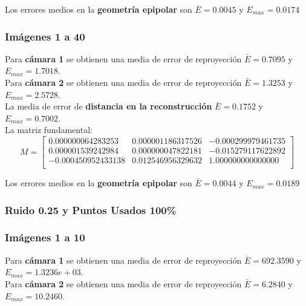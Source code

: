 \documentclass[a4paper, fontsize=11pt]{scrartcl} %
\numberwithin{equation}{section} %
\numberwithin{figure}{section} %
\numberwithin{table}{section} %
\begin{document}
	Los errores medios en la \textbf{geometría epipolar} son $\bar{E} =  0.0045$ y $E_{max} = 0.0174$
	
	\subsubsection*{Imágenes 1 a 40}
	
	Para \textbf{cámara 1} se obtienen una media de error de reproyección $\bar{E} = 0.7095$ y $E_{max} = 1.7018$.\\
	Para \textbf{cámara 2} se obtienen una media de error de reproyección $\bar{E} = 1.3253$ y $E_{max} = 2.5728$.\\
	
	La media de error de \textbf{distancia en la reconstrucción} $\bar{E} = 0.1752$ y $E_{max} = 0.7002$.\\
	La matriz fundamental:
	\[
	M=
	\begin{bmatrix}
	0.000000064283253&	0.000001186317526&	-0.000299979461735 \\
	0.000001539242984&	0.000000047822181&	-0.015279117622892 \\
	-0.000450952433138&	0.012546956329632&	1.000000000000000  \\
	
	\end{bmatrix}
	\]
	
	Los errores medios en la \textbf{geometría epipolar} son $\bar{E} =  0.0044$ y $E_{max} = 0.0189$
	
	
	\subsubsection{Ruido 0.25 y Puntos Usados 100\%}
	
	\subsubsection*{Imágenes 1 a 10}
	
	Para \textbf{cámara 1} se obtienen una media de error de reproyección $\bar{E} = 692.3590$ y $E_{max} = 1.3236e+03$.\\
	Para \textbf{cámara 2} se obtienen una media de error de reproyección $\bar{E} = 6.2840$ y $E_{max} = 10.2460$.\\
	
\end{document}
